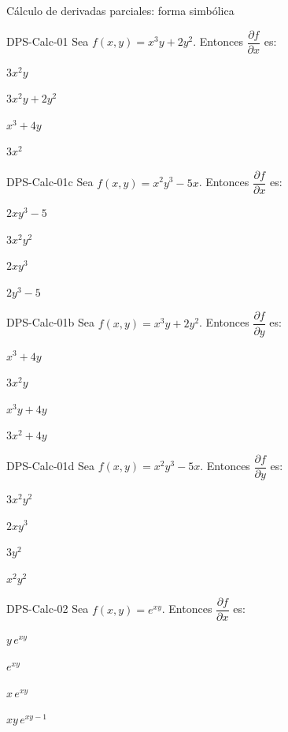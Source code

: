 \documentclass[a4,11pt]{aleph-notas}
\begin{document}
\begin{quiz}{Cálculo de derivadas parciales: forma simbólica}

\begin{multi}[]%
    {DPS-Calc-01}
    Sea $f(x,y) = x^3 y + 2y^2$. Entonces $\dfrac{\partial f}{\partial x}$ es:
    \item* $3x^2 y$
    \item $3x^2 y + 2y^2$
    \item $x^3 + 4y$
    \item $3x^2$
\end{multi}

\begin{multi}[]%
    {DPS-Calc-01c}
    Sea $f(x,y) = x^2 y^3 - 5x$. Entonces $\dfrac{\partial f}{\partial x}$ es:
    \item* $2xy^3 - 5$
    \item $3x^2y^2$
    \item $2xy^3$
    \item $2y^3 - 5$
\end{multi}

\begin{multi}[]%
    {DPS-Calc-01b}
    Sea $f(x,y) = x^3 y + 2y^2$. Entonces $\dfrac{\partial f}{\partial y}$ es:
    \item* $x^3 + 4y$
    \item $3x^2 y$
    \item $x^3 y + 4y$
    \item $3x^2 + 4y$
\end{multi}

\begin{multi}[]%
    {DPS-Calc-01d}
    Sea $f(x,y) = x^2 y^3 - 5x$. Entonces $\dfrac{\partial f}{\partial y}$ es:
    \item* $3x^2 y^2$
    \item $2xy^3$
    \item $3y^2$
    \item $x^2 y^2$
\end{multi}

\begin{multi}[]%
    {DPS-Calc-02}
    Sea $f(x,y) = e^{xy}$. Entonces $\dfrac{\partial f}{\partial x}$ es:
    \item* $y\, e^{xy}$
    \item $e^{xy}$
    \item $x\, e^{xy}$
    \item $xy\, e^{xy-1}$
\end{multi}


\end{quiz}
\end{document}
